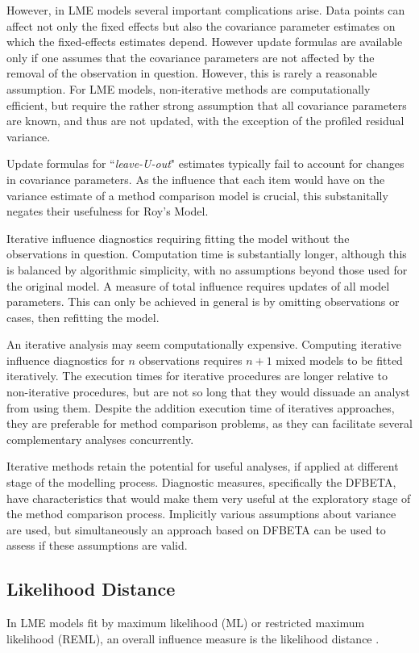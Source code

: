 \documentclass[12pt, a4paper]{report}
\theoremstyle{definition}
\theoremstyle{remark}
\begin{document}
However, in LME models several important complications arise. Data points can affect not only the fixed effects but also the covariance parameter estimates on which the fixed-effects estimates depend. However update formulas are available only if one assumes that the covariance parameters are not affected by the removal of the observation in question. However, this is rarely a reasonable assumption.
For LME models, non-iterative methods are computationally efficient, but require the rather strong assumption that all covariance parameters are known, and thus are not updated, with the exception of the profiled residual variance.

Update formulas for ``\textit{leave-U-out}" estimates typically fail to account for changes in covariance parameters.  As the influence that each item would have on the variance estimate of a method comparison model is crucial, this substanitally negates their usefulness for Roy's Model.

Iterative influence diagnostics requiring fitting the model without the observations in question. Computation time is substantially longer, although this is balanced by algorithmic simplicity, with no assumptions beyond those used for the original model. A measure of total influence requires updates of all model parameters. This can only be achieved in general is by omitting observations or cases, then refitting the model. 


An iterative analysis may seem computationally expensive. Computing iterative influence diagnostics for $n$ observations requires $n+1$ mixed models to be fitted iteratively.
The execution times for iterative procedures are longer relative to non-iterative procedures, but are not so long that they would dissuade an analyst from using them.
Despite the addition execution time of iteratives
approaches, they are preferable for method comparison problems, as they can facilitate several complementary analyses concurrently. 

Iterative methods retain the potential for useful analyses, if applied at different stage of the modelling process. Diagnostic measures, specifically the DFBETA, have characteristics that would make them very useful at the exploratory stage of the method comparison process. Implicitly various assumptions about variance are used, but simultaneously an approach based on DFBETA can be used to assess if these assumptions are valid.




\subsection{Likelihood Distance}
In LME models fit by
 maximum likelihood (ML) or  restricted maximum likelihood (REML), an overall influence measure is the  likelihood distance \citep{CookWeisberg}.
\end{document}
